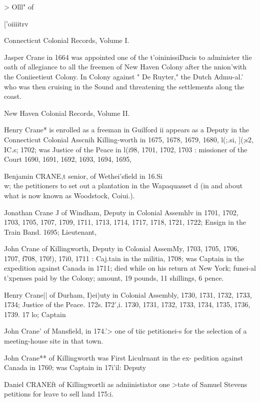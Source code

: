 \documentclass[oneside]{book}
\begin{document}
> Olll" of 


['oiiiitrv 




Connecticut Colonial Records, Volume I. 

Jasper Crane in 1664 was appointed one of the t'oininissiDncis 
to administer tlie oath of allegiance to all the freemen of New 
Haven Colony after the nnion'with the Coniieetieut Colony. In 
Colony against " De Ruyter," the Dutch Admu-al.' who was then 
cruising in the Sound and threatening the settlements along the 
coast. 

New Haven Colonial Records, Volume II. 

Henry Crane* is enrolled as a freeman in Guilford ii 
appears as a Deputy in the Connecticut Colonial Asscnih 
Killing-worth in 1675, 1678, 1679, 1680, l(;.si, ](;s2, IC.s; 
1702; was Justice of the Peace in l(i98, 1701, 1702, 1703 : 
missioner of the Court 1690, 1691, 1692, 1693, 1694, 1695, 

Benjamin CRANE,t senior, of Wethei'sfield in 16.Si\\ w; 
the petitioners to set out a plantation in the Wapaquasset d 
(in and about what is now known as Woodstock, Coiui.). 

Jonathan Crane J of Windham, Deputy in Colonial Assemhlv 
in 1701, 1702, 1703, 1705, 1707, 1709, 1711, 1713, 1714, 1717, 
1718, 1721, 1722; Ensign in the Train Band. 1695; Lieutenant, 

John Crane of Killingworth, Deputy in Colonial AssemMy, 
1703, 1705, 1706, 1707, f708, 170!), 17i0, 1711 : Caj.tain in the 
militia, 1708; was Captain in the expedition against Canada in 
1711; died while on his return at New York; funei-al t'xpenses 
paid by the Colony; amount, 19 pounds, 11 shillings, 6 pence. 

Henry Crane|| of Durham, I)ei)uty in Colonial Assembly, 
1730, 1731, 1732, 1733, 1734; Justice of the Peace. 172s. I72',i. 
1730, 1731, 1732, 1733, 1734, 1735, 1736, 1739. 17 lo; Captain 

John Crane' of Mansfield, in 174.'> one of tiic petitionei-s for 
the selection of a meeting-house site in that town. 

John Crane** of Killingworth was First Liculrnant in the ex- 
pedition against Canada in 1760; was Captain in 17i'il: Deputy 

Daniel CRANEft of Killingwortli as adniinistiator one >tate of 
Samuel Stevens petitions for leave to sell land 175:i. 
\end{document}
